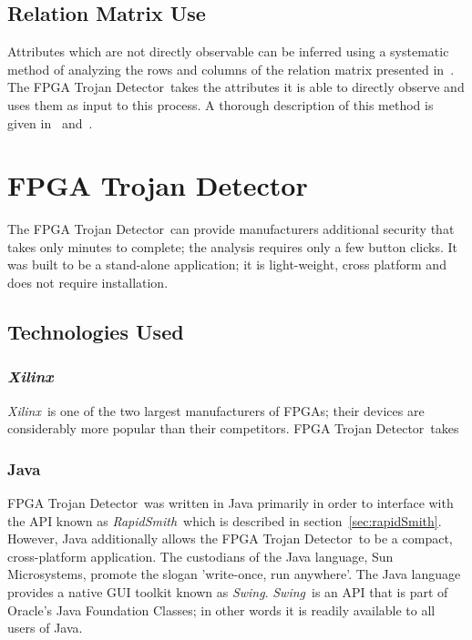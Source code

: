 \documentclass[conference]{IEEEtran}
\newcommand{\Xilinx}{\textit{\gls{Xilinx}}~}
\newcommand{\Name}{\acrshort{FPGA} Trojan Detector}
\newcommand{\NameNoPeriod}{\Name~}
\newcommand{\Swing}{\textit{Swing}~}
\newcommand{\SwingEnd}{\textit{Swing}}
\newcommand{\RapidSmith}{\textit{RapidSmith}~}
\begin{document}
\subsection{Relation Matrix Use} \label{sec:matrixUse}
Attributes which are not directly observable can be inferred using a systematic method of analyzing the rows and columns of the relation matrix presented in~\cite{samerAttribute}.
The \NameNoPeriod takes the attributes it is able to directly observe and uses them as input to this process.
A thorough description of this method is given in~\cite{samerDissertation} and~\cite{meCategorization}.

\section{\Name} \label{sec:implementation}
The \NameNoPeriod can provide manufacturers additional security that takes only minutes to complete; the analysis requires only a few button clicks.
It was built to be a stand-alone application; it is light-weight, cross platform and does not require installation.
\subsection{Technologies Used}
\subsubsection{\Xilinx}
\Xilinx is one of the two largest manufacturers of \acrshort{FPGA}s; their devices are considerably more popular than their competitors.
\NameNoPeriod takes 

\subsubsection{Java} \label{sec:java}
\NameNoPeriod was written in Java primarily in order to interface with the \acrshort{API} known as \RapidSmith which is described in section~\ref{sec:rapidSmith}.
However, Java additionally allows the \NameNoPeriod to be a compact, cross-platform application.
The custodians of the Java language, Sun Microsystems, promote the slogan 'write-once, run anywhere'. 
The Java language provides a native \acrfull{GUI} toolkit known as \SwingEnd.
\Swing is an \acrshort{API} that is part of Oracle's Java Foundation Classes; in other words it is readily available to all users of Java.
\end{document}
